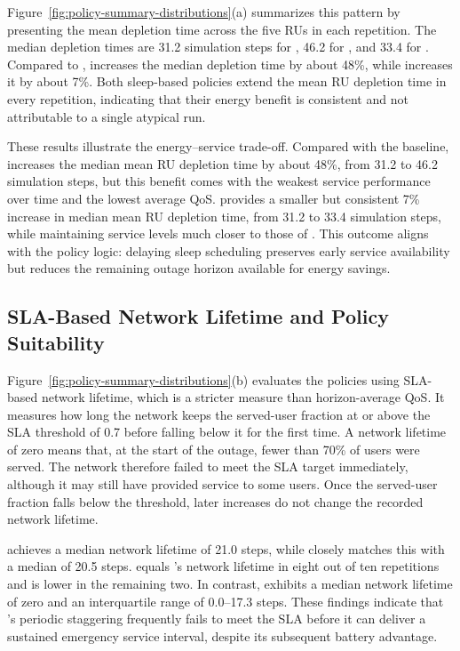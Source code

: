 Figure~\ref{fig:policy-summary-distributions}(a) summarizes this pattern by presenting the mean depletion time across the five RUs in each repetition. The median depletion times are 31.2 simulation steps for , 46.2 for , and 33.4 for .  Compared to ,  increases the median depletion time by about 48\%, while  increases it by about 7\%. Both sleep-based policies extend the mean RU depletion time in every repetition, indicating that their energy benefit is consistent and not attributable to a single atypical run.

These results illustrate the energy--service trade-off. Compared with the  baseline,  increases the median mean RU depletion time by about 48\%, from 31.2 to 46.2 simulation steps, but this benefit comes with the weakest service performance over time and the lowest average QoS.  provides a smaller but consistent 7\% increase in median mean RU depletion time, from 31.2 to 33.4 simulation steps, while maintaining service levels much closer to those of . This outcome aligns with the policy logic: delaying sleep scheduling preserves early service availability but reduces the remaining outage horizon available for energy savings.

\subsection{SLA-Based Network Lifetime and Policy Suitability}

Figure~\ref{fig:policy-summary-distributions}(b) evaluates the policies using SLA-based network lifetime, which is a stricter measure than horizon-average QoS. It measures how long the network keeps the served-user fraction at or above the SLA threshold of 0.7 before falling below it for the first time. A network lifetime of zero means that, at the start of the outage, fewer than 70\% of users were served. The network therefore failed to meet the SLA target immediately, although it may still have provided service to some users. Once the served-user fraction falls below the threshold, later increases do not change the recorded network lifetime.

 achieves a median network lifetime of 21.0 steps, while  closely matches this with a median of 20.5 steps.   equals 's network lifetime in eight out of ten repetitions and is lower in the remaining two. In contrast,  exhibits a median network lifetime of zero and an interquartile range of 0.0--17.3 steps. These findings indicate that 's periodic staggering frequently fails to meet the SLA before it can deliver a sustained emergency service interval, despite its subsequent battery advantage.

